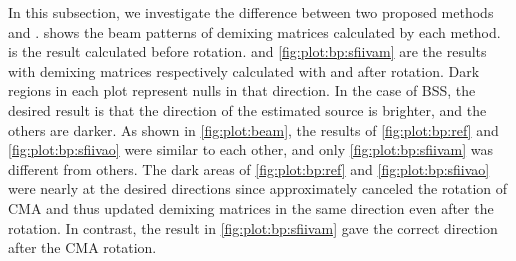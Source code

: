 \documentclass[sip,biber]{now-journal}
\begin{document}
In this subsection, we investigate the difference between two proposed methods \SFIIVAo{} and \SFIIVAo{}.
 shows the beam patterns of demixing matrices calculated by each method.
 is the result calculated before rotation.
 and \cref{fig:plot:bp:sfiivam} are the results with demixing matrices respectively calculated with \SFIIVAm{} and \SFIIVAo{} after rotation.
Dark regions in each plot represent nulls in that direction.
In the case of BSS, the desired result is that the direction of the estimated source is brighter, and the others are darker.
As shown in \cref{fig:plot:beam}, the results of \cref{fig:plot:bp:ref} and \cref{fig:plot:bp:sfiivao} were similar to each other, and only \cref{fig:plot:bp:sfiivam} was different from others.
The dark areas of \cref{fig:plot:bp:ref} and \cref{fig:plot:bp:sfiivao} were nearly at the desired directions since \SFIIVAo{} approximately canceled the rotation of CMA and thus updated demixing matrices in the same direction even after the rotation.
In contrast, the result in \cref{fig:plot:bp:sfiivam} gave the correct direction after the CMA rotation.
\end{document}
